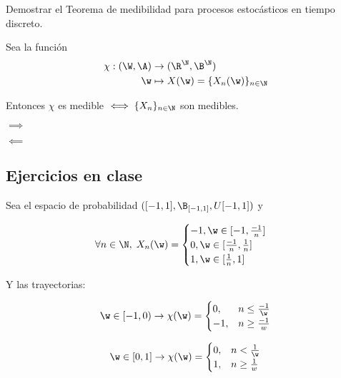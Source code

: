 \begin{ejer}
  Demostrar el Teorema de medibilidad para procesos estocásticos en tiempo discreto.
\end{ejer}

\begin{sol}
  Sea la función \begin{align*}
    \chi : (\W, \A) & \to (\R^\N, \B^\N) \\
    \w & \mapsto X(\w) = \{X_n(\w)\}_{n \in \N}
  \end{align*}

  Entonces $\chi$ es medible $\iff \{X_n\}_{n \in \N}$ son medibles.

  $\boxed \implies$


  $\boxed \impliedby$
\end{sol}


\subsection{Ejercicios en clase}

\begin{ejer}
  Sea el espacio de probabilidad $([-1, 1], \B_{[-1, 1]}, U[-1, 1])$ y

  $$\forall n \in \N, \; X_n(\w) =
    \begin{cases}
      -1, \w \in [-1, \frac{-1}{n}] \\
      0, \w \in [\frac{-1}{n}, \frac{1}{n}] \\
      1, \w \in [\frac{1}{n}, 1]
    \end{cases}$$

  Y las trayectorias:

  \begin{equation*}
    \w \in [-1, 0) \rightarrow \chi(\w) =
  \begin{cases}
        0, & n \leq \frac{-1}{\w} \\
        -1, & n \geq \frac{-1}{w}
  \end{cases}
  \end{equation*}

  \begin{equation*}
    \w \in [0, 1] \rightarrow \chi(\w) =
  \begin{cases}
        0, & n < \frac{1}{\w} \\
        1, & n \geq \frac{1}{w}
  \end{cases}
  \end{equation*}
\end{ejer}

